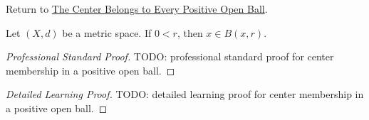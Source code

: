 \newpage
{}
\label{prf:fv-msml-center-mem-ball}

\begin{remark*}[Return]
Return to \hyperref[thm:fv-msml-center-mem-ball]{The Center Belongs to Every Positive Open Ball}.
\end{remark*}

\begin{theorem*}
Let $(X,d)$ be a metric space. If \(0<r\), then \(x\in B(x,r)\).
\end{theorem*}

\begin{proof}[Professional Standard Proof]
\LRAProofBodyStart
TODO: professional standard proof for center membership in a positive open ball.
\end{proof}

\begin{proof}[Detailed Learning Proof]
\LRAProofBodyStart
TODO: detailed learning proof for center membership in a positive open ball.
\end{proof}

\begin{remark*}
\end{remark*}

\NoLocalDependencies

\clearpage
